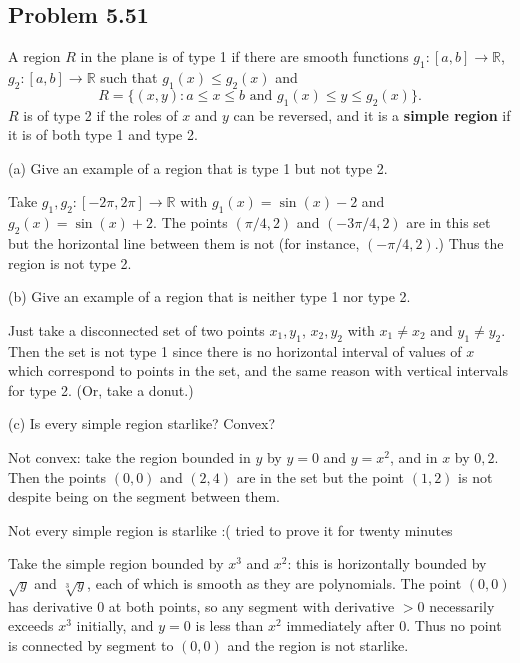 \documentclass{amsart}
\begin{document}
\newpage

\subsection*{Problem 5.51} A region \( R \) in the plane is of type 1 if there are smooth functions \( g_1 : [a, b] \to \mathbb{R} \), \( g_2 : [a, b] \to \mathbb{R} \) such that \( g_1(x) \leq g_2(x) \) and
\[
R = \{(x, y) : a \leq x \leq b \text{ and } g_1(x) \leq y \leq g_2(x)\}.
\]
\( R \) is of type 2 if the roles of \( x \) and \( y \) can be reversed, and it is a \textbf{simple region} if it is of both type 1 and type 2.

(a) Give an example of a region that is type 1 but not type 2.

\medskip \noindent Take $g_1, g_2: [-2\pi, 2\pi]\to\mathbb{R}$ with $g_1(x)=\sin(x)-2$ and
$g_2(x)=\sin(x)+2$. The points $(\pi/4, 2)$ and $(-3\pi/4, 2)$ are in this set but the horizontal
line between them is not (for instance, $(-\pi/4, 2)$.) Thus the region is not type 2. 

\bigskip

(b) Give an example of a region that is neither type 1 nor type 2.

\medskip \noindent Just take a disconnected set of two points $x_1, y_1$, $x_2, y_2$ with
$x_1\neq x_2$ and $y_1\neq y_2$. Then the set is not type 1 since there is no horizontal interval
of values of $x$ which correspond to points in the set, and the same reason with vertical intervals for type 2.
(Or, take a donut.)

\bigskip


(c) Is every simple region starlike? Convex?

\medskip \noindent Not convex: take the region bounded in $y$ by $y=0$ and $y=x^2$, and in $x$ by $0, 2$. Then the points $(0,0)$ and 
$(2, 4)$ are in the set but the point $(1, 2)$ is not despite being on the segment between them.

\medskip \noindent Not every simple region is starlike :( tried to prove it for twenty minutes

\medskip \noindent Take the simple region bounded by $x^3$ and $x^2$: this is horizontally bounded
by $\sqrt{y}$ and $\sqrt[3]{y}$, each of which is smooth as they are polynomials. The point $(0, 0)$ has
derivative $0$ at both points, so any segment with derivative $>0$ necessarily exceeds $x^3$ initially, and
$y=0$ is less than $x^2$ immediately after $0$. Thus no point is connected by segment to $(0, 0)$ and the
region is not starlike.
\end{document}
